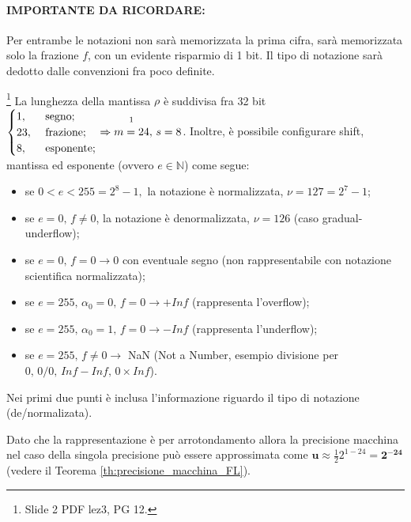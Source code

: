 \paragraph{IMPORTANTE DA RICORDARE: }Per entrambe le notazioni non sarà memorizzata la prima cifra, sarà memorizzata solo la frazione $f$, con un evidente risparmio di 1 bit. Il tipo di notazione sarà dedotto dalle convenzioni fra poco definite.

\begin{definition}\footnote{Slide 2 PDF lez3, PG 12.}
	La lunghezza della mantissa $\rho$ è suddivisa fra 32 bit $\begin{cases}
		1, &\text{ segno};\\
		23, &\text{ frazione};\\
		8, &\text{ esponente};
	\end{cases}\Rightarrow \overset{\footnotemark}{m=24},\, s=8$. Inoltre, è possibile configurare shift, mantissa ed esponente (ovvero $e\in\mathbb N$) come segue:
	
	\begin{itemize}
		\item se $0<e<255=2^8-1,$ la notazione è normalizzata, $\nu=127=2^7-1$;
		\item se $e=0,\, f\neq 0$, la notazione è denormalizzata, $\nu=126$ (caso gradual-underflow);
		\item se $e=0,\, f=0\rightarrow 0$ con eventuale segno (non rappresentabile con notazione scientifica normalizzata);
		\item se $e=255,\,\alpha_0=0,\,f=0\rightarrow +Inf$ (rappresenta l'overflow);
		\item se $e=255,\,\alpha_0=1,\,f=0\rightarrow -Inf$ (rappresenta l'underflow);
		\item se $e=255, \,f\neq 0 \rightarrow$ NaN (Not a Number, esempio divisione per $0,\, 0/0,\, Inf-Inf,\, 0\times Inf$).
	\end{itemize}
\end{definition}
Nei primi due punti è inclusa l'informazione riguardo il tipo di notazione (de/normalizata).

\begin{remark}
	Dato che la rappresentazione è per arrotondamento allora la precisione macchina nel caso della singola precisione può essere approssimata come $\boldsymbol{u\approx} \frac{1}{2} 2^{1-24} = \boldsymbol{2^{-24}}$ (vedere il Teorema \ref{th:precisione_macchina_FL}).
\end{remark}

